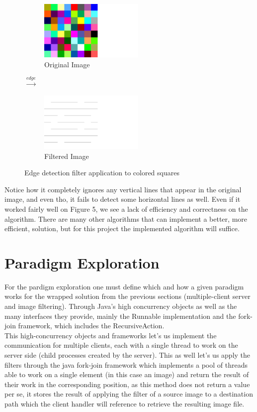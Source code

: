 \documentclass[a4paper,12pt]{article}
\begin{document}
	\begin{figure}[h]
		\centering
		\begin{subfigure}{.47\textwidth}
			\centering
			\includegraphics[width=5cm]{coloredsquares.png}
			\caption{Original Image}
		\end{subfigure}%
		{\LARGE$\xrightarrow{edge}$}%
		\begin{subfigure}{.47\textwidth}
			\centering
			\includegraphics[width=5cm]{jv_edge_coloredsquares.png}
			\caption{Filtered Image}
		\end{subfigure}

		\caption{Edge detection filter application to colored squares}
	\end{figure}	
	
	Notice how it completely ignores any vertical lines that appear in the original image, and even tho, it fails to detect some horizontal lines as well. Even if it worked fairly well on Figure 5, we see a lack of efficiency and correctness on the algorithm. There are many other algorithms that can implement a better, more efficient, solution, but for this project the implemented algorithm will suffice. 
	
	\section{Paradigm Exploration}	
	
	For the pardigm exploration one must define which and how a given paradigm works for the wrapped solution from the previous sections (multiple-client server and image filtering). Through Java's high concurrency objects as well as the many interfaces they provide, mainly the Runnable implementation and the fork-join framework, which includes the RecursiveAction.\\
	
	This high-concurrency objects and frameworks let's us implement the communication for multiple clients, each with a single thread to work on the server side (child processes created by the server). This as well let's us apply the filters through the java fork-join framework which implements a pool of threads able to work on a single element (in this case an image) and return the result of their work in the corresponding position, as this method does not return a value per se, it stores the result of applying the filter of a source image to a destination path which the client handler will reference to retrieve the resulting image file.
	
\end{document}
